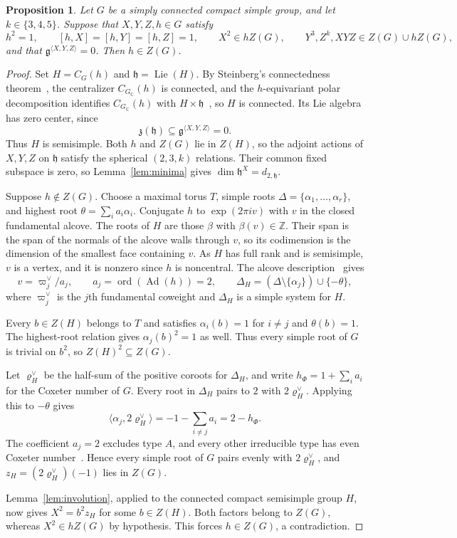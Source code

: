 \documentclass[11pt,a4paper,reqno]{amsart}
\theoremstyle{plain}
\newtheorem{proposition}[theorem]{Proposition}
\theoremstyle{definition}
\theoremstyle{remark}
\numberwithin{equation}{section}
\DeclareMathOperator{\Lie}{Lie}
\DeclareMathOperator{\Ad}{Ad}
\newcommand{\CC}{\mathbb C}
\newcommand{\ZZ}{\mathbb Z}
\newcommand{\fg}{\mathfrak g}
\newcommand{\fh}{\mathfrak h}
\newcommand{\pair}[2]{\langle #1,#2\rangle}
\newcommand{\eexp}[1]{\exp(2\pi i #1)}
\begin{document}
\begin{proposition}\label{prop:central-involution}
Let $G$ be a simply connected compact simple group, and let $k\in\{3,4,5\}$. Suppose that $X,Y,Z,h\in G$ satisfy
\[
h^2=1,\qquad [h,X]=[h,Y]=[h,Z]=1,\qquad X^2\in hZ(G),\qquad Y^3,Z^k,XYZ\in Z(G)\cup hZ(G),
\]
and that $\fg^{\langle X,Y,Z\rangle}=0$. Then $h\in Z(G)$.
\end{proposition}
\begin{proof}
Set $H=C_G(h)$ and $\fh=\Lie(H)$. By Steinberg's connectedness theorem~\cite[Theorem~8.1]{Steinberg}, the centralizer $C_{G_{\CC}}(h)$ is connected, and the $h$-equivariant polar decomposition identifies $C_{G_{\CC}}(h)$ with $H\times\fh$~\cite[\S2.4(3)]{Bergeron}, so $H$ is connected. Its Lie algebra has zero center, since
\[
\mathfrak z(\fh)\subseteq\fg^{\langle X,Y,Z\rangle}=0.
\]
Thus $H$ is semisimple. Both $h$ and $Z(G)$ lie in $Z(H)$, so the adjoint actions of $X,Y,Z$ on $\fh$ satisfy the spherical $(2,3,k)$ relations. Their common fixed subspace is zero, so Lemma~\ref{lem:minima} gives $\dim\fh^X=d_{2,\fh}$.

Suppose $h\notin Z(G)$. Choose a maximal torus $T$, simple roots $\Delta=\{\alpha_1,\ldots,\alpha_r\}$, and highest root $\theta=\sum_i a_i\alpha_i$. Conjugate $h$ to $\eexp{v}$ with $v$ in the closed fundamental alcove. The roots of $H$ are those $\beta$ with $\beta(v)\in\ZZ$. Their span is the span of the normals of the alcove walls through $v$, so its codimension is the dimension of the smallest face containing $v$. As $H$ has full rank and is semisimple, $v$ is a vertex, and it is nonzero since $h$ is noncentral. The alcove description~\cite[Propositions~3.3--3.4, Remark~3.6, and Theorem~3.7]{KostantBDS} gives
\[
v=\varpi_j^\vee/a_j,\qquad a_j=\operatorname{ord}(\Ad(h))=2,\qquad
\Delta_H=(\Delta\setminus\{\alpha_j\})\cup\{-\theta\},
\]
where $\varpi_j^\vee$ is the $j$th fundamental coweight and $\Delta_H$ is a simple system for $H$.

Every $b\in Z(H)$ belongs to $T$ and satisfies $\alpha_i(b)=1$ for $i\ne j$ and $\theta(b)=1$. The highest-root relation gives $\alpha_j(b)^2=1$ as well. Thus every simple root of $G$ is trivial on $b^2$, so $Z(H)^2\subseteq Z(G)$.

Let $\varrho_H^\vee$ be the half-sum of the positive coroots for $\Delta_H$, and write $h_\Phi=1+\sum_i a_i$ for the Coxeter number of $G$. Every root in $\Delta_H$ pairs to $2$ with $2\varrho_H^\vee$. Applying this to $-\theta$ gives
\[
\pair{\alpha_j}{2\varrho_H^\vee}=-1-\sum_{i\ne j}a_i=2-h_\Phi.
\]
The coefficient $a_j=2$ excludes type $A$, and every other irreducible type has even Coxeter number~\cite[p.~372]{EKV}. Hence every simple root of $G$ pairs evenly with $2\varrho_H^\vee$, and $z_H=(2\varrho_H^\vee)(-1)$ lies in $Z(G)$.

Lemma~\ref{lem:involution}, applied to the connected compact semisimple group $H$, now gives $X^2=b^2z_H$ for some $b\in Z(H)$. Both factors belong to $Z(G)$, whereas $X^2\in hZ(G)$ by hypothesis. This forces $h\in Z(G)$, a contradiction.
\end{proof}
\end{document}
